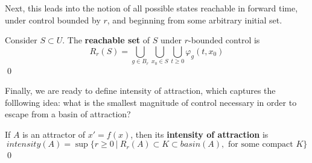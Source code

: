 
Next, this leads into the notion of all possible states reachable in forward time, under control bounded by $r$, and beginning from some arbitrary initial set. 

\begin{definition}
	Consider $S\subset  U$. The \textbf{reachable set} of $S$ under $r$-bounded control is
	$$R_r(S) =  \bigcup\limits_{g \in B_r} \bigcup\limits_{x_0 \in S} \bigcup\limits_{t \geq 0}  \varphi_g(t,x_0)$$ \qed
\end{definition}

Finally, we are ready to define intensity of attraction, which captures the folllowing idea: what is the smallest magnitude of control necessary in order to escape from a basin of attraction? 

\begin{definition}
	If $A$ is an attractor of $x' = f(x)$, then its \textbf{intensity of attraction} is 
	$$intensity(A) = \sup\{ r \geq 0 ~|~ R_r(A) \subset K \subset basin(A), \text{ for some compact }K \}$$ \qed
\end{definition}

